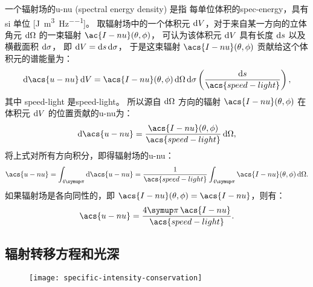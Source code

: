一个辐射场的\acl{u-nu} (spectral energy density) 是指
每单位体积的\ac{spec-energy}，具有 \ac{si} 单位
[\si{\joule\per\cubic\meter\per\hertz}]。
取辐射场中的一个体积元 $\mathrm{d}V$，对于来自某一方向的立体角元 $\mathrm{d}\Omega$
的一束辐射 $\ac{I-nu}(\theta,\phi)$，
可认为该体积元 $\mathrm{d}V$ 具有长度 $\mathrm{d}s$ 以及横截面积 $\mathrm{d}\sigma$，
即 $\mathrm{d}V = \mathrm{d}s\,\mathrm{d}\sigma$，
于是这束辐射 $\acs{I-nu}(\theta,\phi)$ 贡献给这个体积元的谱能量为：
\begin{equation}
  \D{\acs{u-nu}}\,\D{V}
    = \acs{I-nu}(\theta,\phi) \,\D{\Omega}\,\D{\sigma}
      \left( \frac{\D{s}}{\acs{speed-light}} \right) ,
\end{equation}
其中 \acs{speed-light} 是\acl{speed-light}。
所以源自 $\mathrm{d}\Omega$ 方向的辐射 $\acs{I-nu}(\theta,\phi)$
在体积元 $\mathrm{d}V$ 的位置贡献的\acl{u-nu}为：
\begin{equation}
  \D{\acs{u-nu}}
    = \frac{\acs{I-nu}(\theta,\phi)}{\acs{speed-light}} \,\D{\Omega} ,
\end{equation}
将上式对所有方向积分，即得辐射场的\acl{u-nu}：
\begin{equation}
  \label{eq:spectral-energy-density}
  \acs{u-nu}
    = \int_{4\Cpi} \D{\acs{u-nu}}
    = \frac{1}{\acs{speed-light}}
      \int_{4\Cpi} \acs{I-nu}(\theta,\phi) \,\D{\Omega} .
\end{equation}
如果辐射场是各向同性的，即 $\acs{I-nu}(\theta,\phi) = \acs{I-nu}$，则有：
\begin{equation}
  \label{eq:spectral-energy-density-iso}
  \acs{u-nu} = \frac{4\Cpi \, \acs{I-nu}}{\acs{speed-light}} .
\end{equation}

\subsection{辐射转移方程和光深}
\label{sec:radiative-transfer}

\begin{figure}[htp]
  \centering
  \texttt{[image: specific-intensity-conservation]}
  \label{fig:intensity-conservation}
\end{figure}

